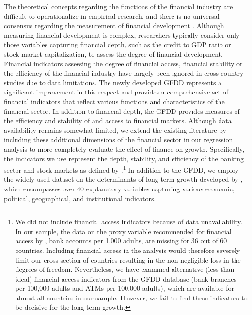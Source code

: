 The theoretical concepts regarding the functions of the financial industry are difficult to operationalize in empirical research, and there is no universal consensus regarding the measurement of financial development \citep{KingLevine1993a}. Although measuring financial development is complex, researchers typically consider only those variables capturing financial depth, such as the credit to GDP ratio or stock market capitalization, to assess the degree of financial development. Financial indicators assessing the degree of financial access, financial stability or the efficiency of the financial industry have largely been ignored in cross-country studies due to data limitations. The newly developed \ac{GFDD} represents a significant improvement in this respect and provides a comprehensive set of financial indicators that reflect various functions and characteristics of the financial sector. In addition to financial depth, the \ac{GFDD} provides measures of the efficiency and stability of and access to financial markets. Although data availability remains somewhat limited, we extend the existing literature by including these additional dimensions of the financial sector in our regression analysis to more completely evaluate the effect of finance on growth. Specifically, the indicators we use represent the depth, stability, and efficiency of the banking sector and stock markets as defined by \citet{Cihaketal2013}.\footnote{We did not include financial access indicators because of data unavailability. In our sample, the data on the proxy variable recommended for financial access by \citet{Cihaketal2013}, bank accounts per 1,000 adults, are missing for 36 out of 60 countries. Including financial access in the analysis would therefore severely limit our cross-section of countries resulting in the non-negligible loss in the degrees of freedom. Nevertheless, we have examined alternative (less than ideal) financial access indicators from the \ac{GFDD} database (bank branches per 100,000 adults and ATMs per 100,000 adults), which are available for almost all countries in our sample. However, we fail to find these indicators to be decisive for the long-term growth.} In addition to the \ac{GFDD}, we employ the widely used dataset on the determinants of long-term growth developed by \citet{Fernandezetal2001}, which encompasses over 40 explanatory variables capturing various economic, political, geographical, and institutional indicators. 

